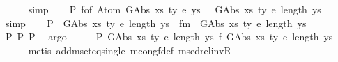 \begin{isabellebody}
\ \ \ \ \isamarkupfalse%
\ simp\isanewline
\ \ \isamarkupfalse%
\ P{}{\isacharcolon}{\kern0pt}\ {\isachardoublequoteopen}f{\isacharunderscore}{\kern0pt}of\ {\isacharparenleft}{\kern0pt}Atom\ {\isacharparenleft}{\kern0pt}GAbs\ xs{}\ ty{}\ e{}{\isacharparenright}{\kern0pt}\ ys{}{\isacharparenright}{\kern0pt}\ {\isacharequal}{\kern0pt}\ {\isacharbraceleft}{\kern0pt}{\isacharhash}{\kern0pt}\ {\isacharparenleft}{\kern0pt}GAbs\ xs{}\ ty{}\ e{}{\isacharcomma}{\kern0pt}\ length\ ys{}{\isacharparenright}{\kern0pt}\ {\isacharhash}{\kern0pt}{\isacharbraceright}{\kern0pt}{\isachardoublequoteclose}\isanewline
\ \ \ \ \isamarkupfalse%
\ simp\isanewline
\ \ \isamarkupfalse%
\ P{}{\isacharcolon}{\kern0pt}\ {\isachardoublequoteopen}{\isacharbraceleft}{\kern0pt}{\isacharhash}{\kern0pt}\ {\isacharparenleft}{\kern0pt}GAbs\ xs{}\ ty{}\ e{}{\isacharcomma}{\kern0pt}\ length\ ys{}{\isacharparenright}{\kern0pt}\ {\isacharhash}{\kern0pt}{\isacharbraceright}{\kern0pt}\ {\isasymsimeq}fm\ {\isacharbraceleft}{\kern0pt}{\isacharhash}{\kern0pt}\ {\isacharparenleft}{\kern0pt}GAbs\ xs{}\ ty{}\ e{}{\isacharcomma}{\kern0pt}\ length\ ys{}{\isacharparenright}{\kern0pt}\ {\isacharhash}{\kern0pt}{\isacharbraceright}{\kern0pt}{\isachardoublequoteclose}\isanewline
\ \ \ \ \isamarkupfalse%
\ P{}\ P{}\ P{}\ \isamarkupfalse%
\ argo\isanewline
\ \ \isamarkupfalse%
\ \isamarkupfalse%
\ P{}{\isacharcolon}{\kern0pt}\ {\isachardoublequoteopen}{\isacharparenleft}{\kern0pt}GAbs\ xs{}\ ty{}\ e{}{\isacharcomma}{\kern0pt}\ length\ ys{}{\isacharparenright}{\kern0pt}\ {\isasymsimeq}f\ {\isacharparenleft}{\kern0pt}GAbs\ xs{}\ ty{}\ e{}{\isacharcomma}{\kern0pt}\ length\ ys{}{\isacharparenright}{\kern0pt}{\isachardoublequoteclose}\isanewline
\ \ \ \ \isamarkupfalse%
\ {\isacharparenleft}{\kern0pt}metis\ add{\isacharunderscore}{\kern0pt}mset{\isacharunderscore}{\kern0pt}eq{\isacharunderscore}{\kern0pt}single\ mcong{\isacharunderscore}{\kern0pt}f{\isacharunderscore}{\kern0pt}def\ msed{\isacharunderscore}{\kern0pt}rel{\isacharunderscore}{\kern0pt}invR{\isacharparenright}{\kern0pt}\isanewline
\ \ \isamarkupfalse%

\end{isabellebody}
